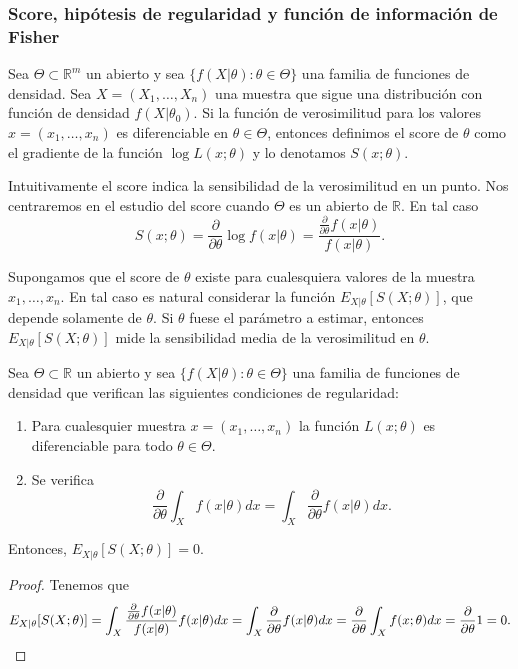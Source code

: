 \documentclass{article}
\begin{document}
    \subsubsection{Score, hipótesis de regularidad y función de información de Fisher}

    \begin{definition}
        Sea $\Theta \subset \mathbb{R}^m$ un abierto y sea $\{f(X|\theta): \theta \in \Theta\}$ una familia de funciones de densidad. Sea $X = (X_1, \ldots, X_n)$ una muestra que sigue una distribución con función de densidad $f(X|\theta_0)$. Si la función de verosimilitud para los valores $x = (x_1, \ldots, x_n)$ es diferenciable en $\theta \in \Theta$, entonces definimos el score de $\theta$ como el gradiente de la función $\log L(x; \theta)$ y lo denotamos $S(x; \theta)$.
    \end{definition}

    Intuitivamente el score indica la sensibilidad de la verosimilitud en un punto. Nos centraremos en el estudio del score cuando $\Theta$ es un abierto de $\mathbb{R}$. En tal caso
    \[S(x; \theta) = \frac{\partial}{\partial \theta} \log f(x | \theta) = \frac{\frac{\partial}{\partial \theta} f(x | \theta)}{f(x | \theta)}.\]

    Supongamos que el score de $\theta$ existe para cualesquiera valores de la muestra $x_1, \ldots, x_n$. En tal caso es natural considerar la función $E_{X|\theta}[S(X;\theta)]$, que depende solamente de $\theta$. Si $\theta$ fuese el parámetro a estimar, entonces $E_{X|\theta}[S(X;\theta)]$ mide la sensibilidad media de la verosimilitud en $\theta$.

    \begin{lem} \label{lem:score:esp}
        Sea $\Theta \subset \mathbb{R}$ un abierto y sea $\{f(X|\theta): \theta \in \Theta\}$ una familia de funciones de densidad que verifican las siguientes condiciones de regularidad:
        \begin{enumerate}
            \item Para cualesquier muestra $x=(x_1, \ldots, x_n)$ la función $L(x; \theta)$ es diferenciable para todo $\theta \in \Theta$.
            \item Se verifica
            \[\frac{\partial}{\partial \theta}\int_{X} f(x| \theta) dx = \int_{X} \frac{\partial}{\partial \theta} f(x| \theta) dx.\]
        \end{enumerate}
        Entonces, $E_{X|\theta}[S(X;\theta)] = 0$.
    \end{lem}
    \begin{proof}
        Tenemos que
        \[E_{X|\theta}[S(X;\theta)] = \int_{X} \frac{\frac{\partial}{\partial \theta} f(x | \theta)}{f(x | \theta)}  f(x | \theta) dx = \int_{X} \frac{\partial}{\partial \theta} f(x | \theta) dx = \frac{\partial}{\partial \theta} \int_{X} f(x; \theta) dx = \frac{\partial}{\partial \theta} 1 = 0. \qedhere\]
    \end{proof}
\end{document}
